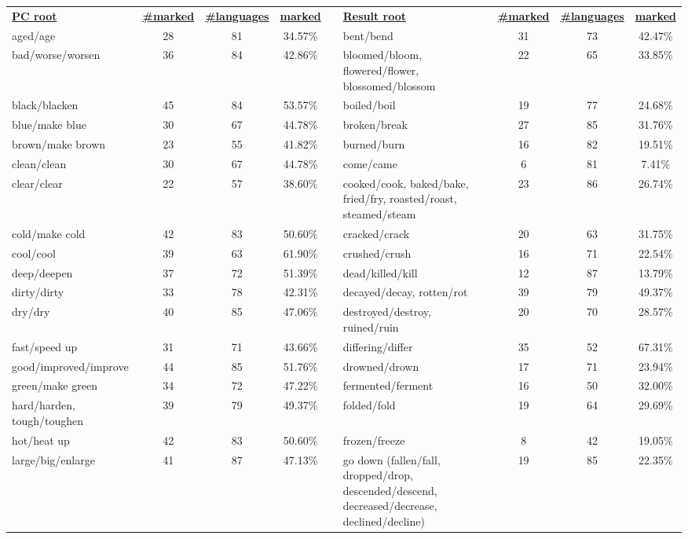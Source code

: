\begin{tabular}{p{3cm}ccccp{3cm}ccc}
\underline{\textbf{PC root}} & \underline{\textbf{\#marked}} & \underline{\textbf{\#languages}} & \underline{\textbf{marked}} & & \underline{\textbf{Result root}} & \underline{\textbf{\#marked}} & \underline{\textbf{\#languages}} & \underline{\textbf{marked}} \\
aged/age & 28 & 81 & 34.57\% & & bent/bend & 31 & 73 & 42.47\% \\
bad/worse/worsen & 36 & 84 & 42.86\% & & bloomed/bloom, flowered/flower, blossomed/blossom & 22 & 65 & 33.85\% \\
black/blacken & 45 & 84 & 53.57\% & & boiled/boil & 19 & 77 & 24.68\% \\
blue/make blue & 30 & 67 & 44.78\% & & broken/break & 27 & 85 & 31.76\% \\
brown/make brown & 23 & 55 & 41.82\% & & burned/burn & 16 & 82 & 19.51\% \\
clean/clean & 30 & 67 & 44.78\% & & come/came & 6 & 81 & 7.41\% \\
clear/clear & 22 & 57 & 38.60\% & & cooked/cook, baked/bake, fried/fry, roasted/roast, steamed/steam & 23 & 86 & 26.74\% \\
cold/make cold & 42 & 83 & 50.60\% & & cracked/crack & 20 & 63 & 31.75\% \\
cool/cool & 39 & 63 & 61.90\% & & crushed/crush & 16 & 71 & 22.54\% \\
deep/deepen & 37 & 72 & 51.39\% & & dead/killed/kill & 12 & 87 & 13.79\% \\
dirty/dirty & 33 & 78 & 42.31\% & & decayed/decay, rotten/rot & 39 & 79 & 49.37\% \\
dry/dry & 40 & 85 & 47.06\% & & destroyed/destroy, ruined/ruin & 20 & 70 & 28.57\% \\
fast/speed up & 31 & 71 & 43.66\% & & differing/differ & 35 & 52 & 67.31\% \\
good/improved/improve & 44 & 85 & 51.76\% & & drowned/drown & 17 & 71 & 23.94\% \\
green/make green & 34 & 72 & 47.22\% & & fermented/ferment & 16 & 50 & 32.00\% \\
hard/harden, tough/toughen & 39 & 79 & 49.37\% & & folded/fold & 19 & 64 & 29.69\% \\
hot/heat up & 42 & 83 & 50.60\% & & frozen/freeze & 8 & 42 & 19.05\% \\
large/big/enlarge & 41 & 87 & 47.13\% & & go down (fallen/fall, dropped/drop, descended/descend, decreased/decrease, declined/decline) & 19 & 85 & 22.35\% \\

\end{tabular}
